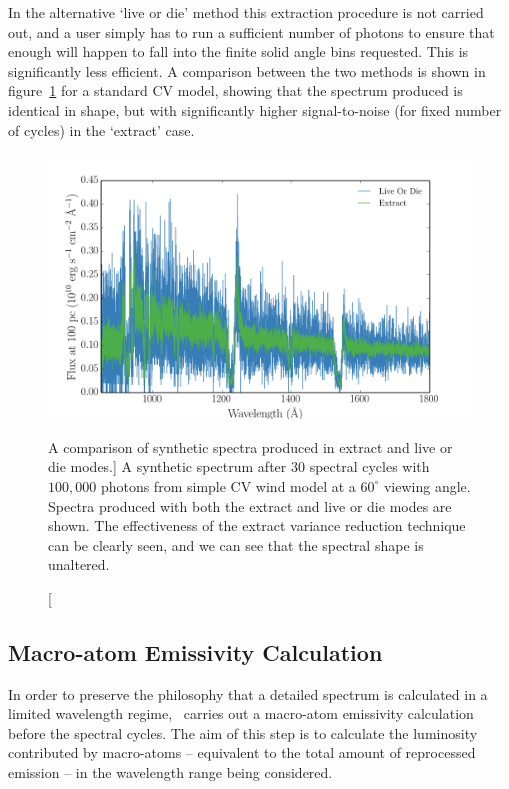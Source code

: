 In the alternative `live or die' method this extraction procedure is not
carried out, and a user simply has to run a sufficient number of 
photons to ensure that enough will happen
to fall into the finite solid angle bins requested. This is significantly
less efficient. A comparison between the two methods is shown in 
figure~\ref{fig:extract_demo} for a standard CV model, showing that the spectrum 
produced is identical in shape, but with significantly higher signal-to-noise (for
fixed number of cycles) in the `extract' case.

\begin{figure}
\centering
\includegraphics[width=1.0\textwidth]{figures/03-radtrans/extract_demo.png}
\caption
[A comparison of synthetic spectra produced in extract and live or die modes.]
{
A synthetic spectrum after $30$ spectral cycles with $100,000$ photons
from simple CV wind model at a $60^\circ$ viewing angle.
Spectra produced with both the extract and live or die modes
are shown. The effectiveness of the extract variance reduction technique can
be clearly seen, and we can see that the spectral shape is unaltered.
} 
\label{fig:extract_demo}
\end{figure}

\subsection{Macro-atom Emissivity Calculation}

In order to preserve the philosophy that a detailed 
spectrum is calculated in a limited wavelength regime, \py\ carries
out a macro-atom emissivity calculation before the spectral cycles.
The aim of this step is to calculate the luminosity contributed
by macro-atoms -- equivalent to the total amount of reprocessed emission -- 
in the wavelength range being considered.

